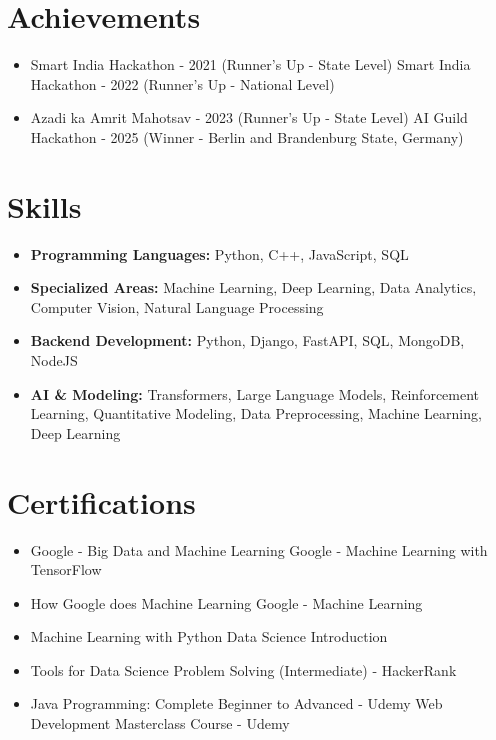 \documentclass[a4paper,10pt]{article}
\begin{document}
\section*{Achievements}
\begin{itemize}
\item Smart India Hackathon - 2021 (Runner's Up - State Level) \hfill Smart India Hackathon - 2022 (Runner's Up - National Level)
\item Azadi ka Amrit Mahotsav - 2023 (Runner's Up - State Level) \hfill AI Guild Hackathon - 2025 (Winner - Berlin and Brandenburg State, Germany)
\end{itemize}

\section*{Skills}
\begin{itemize}
  \item \textbf{Programming Languages:} Python, C++, JavaScript, SQL
  \item \textbf{Specialized Areas:} Machine Learning, Deep Learning, Data Analytics, Computer Vision, Natural Language Processing
  \item \textbf{Backend Development:} Python, Django, FastAPI, SQL, MongoDB, NodeJS
  \item \textbf{AI \& Modeling:} Transformers, Large Language Models, Reinforcement Learning, Quantitative Modeling, Data Preprocessing, Machine Learning, Deep Learning
\end{itemize}

\section*{Certifications}
\begin{itemize}
\item Google - Big Data and Machine Learning \hfill Google - Machine Learning with TensorFlow
\item How Google does Machine Learning \hfill Google - Machine Learning
\item Machine Learning with Python \hfill Data Science Introduction
\item Tools for Data Science \hfill Problem Solving (Intermediate) - HackerRank
\item Java Programming: Complete Beginner to Advanced - Udemy \hfill Web Development Masterclass Course - Udemy
\end{itemize}
\end{document}
